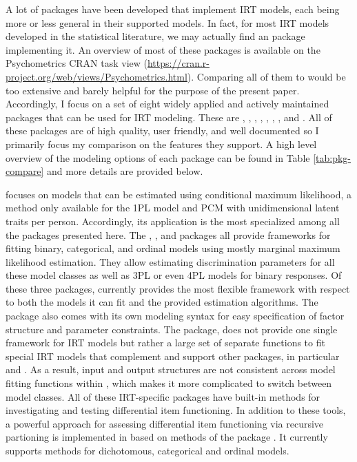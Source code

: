 \documentclass[jss]{jss}
\begin{document}
A lot of  packages have been developed that implement IRT
models, each being more or less general in their supported models. In
fact, for most IRT models developed in the statistical literature, we
may actually find an  package implementing it. An overview
of most of these packages is available on the Psychometrics CRAN task
view (\url{https://cran.r-project.org/web/views/Psychometrics.html}).
Comparing all of them to  would be too extensive and barely
helpful for the purpose of the present paper. Accordingly, I focus on a
set of eight widely applied and actively maintained packages that can be
used for IRT modeling. These are  \citep{eRm}, 
\citep{ltm},  \citep{TAM},  \citep{mirt}, 
\citep{sirt},  \citep{lme4},  \citep{lavaan}, and
 \citep{blavaan}. All of these packages are of high
quality, user friendly, and well documented so I primarily focus my
comparison on the features they support. A high level overview of the
modeling options of each package can be found in Table
\ref{tab:pkg-compare} and more details are provided below.

 focuses on models that can be estimated using conditional
maximum likelihood, a method only available for the 1PL model and PCM
with unidimensional latent traits per person. Accordingly, its
application is the most specialized among all the packages presented
here. The , , and  packages all provide
frameworks for fitting binary, categorical, and ordinal models using
mostly marginal maximum likelihood estimation. They allow estimating
discrimination parameters for all these model classes as well as 3PL or
even 4PL models for binary responses. Of these three packages,
 currently provides the most flexible framework with respect
to both the models it can fit and the provided estimation algorithms.
The package also comes with its own modeling syntax for easy
specification of factor structure and parameter constraints. The
 package, does not provide one single framework for IRT models
but rather a large set of separate functions to fit special IRT models
that complement and support other packages, in particular  and
. As a result, input and output structures are not consistent
across model fitting functions within , which makes it more
complicated to switch between model classes. All of these IRT-specific
packages have built-in methods for investigating and testing
differential item functioning. In addition to these tools, a powerful
approach for assessing differential item functioning via recursive
partioning is implemented in 
\citep{psychotree1, psychotree2} based on methods of the
 package \citep{psychotools}. It currently supports
methods for dichotomous, categorical and ordinal models.
\end{document}
